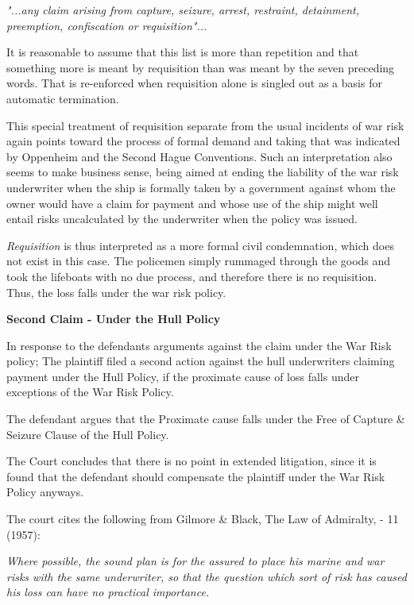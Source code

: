      \textit{ "...any claim arising from capture, seizure, arrest, restraint, detainment, preemption, confiscation or requisition"...}
     
     It is reasonable to assume that this list is more than repetition and that something more is meant by requisition than was meant by the seven preceding words. That is re-enforced when requisition alone is singled out as a basis for automatic termination.
     
     This special treatment of requisition separate from the usual incidents of war risk again points toward the process of formal demand and taking that was indicated by Oppenheim and the Second Hague Conventions. Such an interpretation also seems to make business sense, being aimed at ending the liability of the war risk underwriter when the ship is formally taken by a government against whom the owner would have a claim for payment and whose use of the ship might well entail risks uncalculated by the underwriter when the policy was issued.
     
     \textit{Requisition} is thus interpreted as a more formal civil condemnation, which does not exist in this case. The policemen simply rummaged through the goods and took the lifeboats with no due process, and therefore there is no requisition. Thus, the loss falls under the war risk policy.
    
\textbf{Second Claim - Under the Hull Policy}

    In response to the defendants arguments against the claim under the War Risk policy; The plaintiff filed a second action against the hull underwriters claiming payment under the Hull Policy, if the proximate cause of loss falls under exceptions of the War Risk Policy.
    
    The defendant argues that the Proximate cause falls under the Free of Capture \& Seizure Clause of the Hull Policy.
    
    The Court concludes that there is no point in extended litigation, since it is found that the defendant should compensate the plaintiff under the War Risk Policy anyways.
        
    The court cites the following from Gilmore \& Black, The Law of Admiralty, - 11 (1957):
    
    \textit{Where possible, the sound plan is for the assured to place his marine and war risks
    with the same underwriter, so that the question which sort of risk has caused his
    loss can have no practical importance.}

